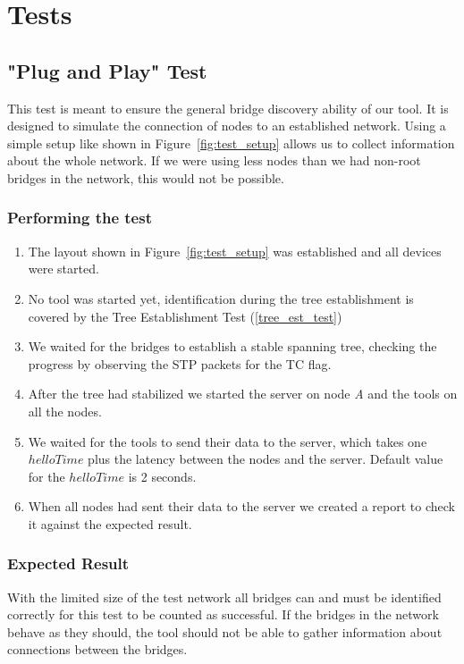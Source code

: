 \section{Tests}
\subsection*{"Plug and Play" Test}
\label{usage_test}
This test is meant to ensure the general bridge discovery ability of our tool.
It is designed to simulate the connection of nodes to an established network.
Using a simple setup like shown in Figure~\ref{fig:test_setup} allows us to collect information about the whole network.
If we were using less nodes than we had non-root bridges in the network, this would not be possible.

\subsubsection*{Performing the test}
\begin{enumerate}
    \item The layout shown in Figure~\ref{fig:test_setup} was established and all devices were started.
    \item No tool was started yet, identification during the tree establishment is covered by the Tree Establishment Test (\ref{tree_est_test})
    \item We waited for the bridges to establish a stable spanning tree, checking the progress by observing the STP packets for the TC flag.
    \item After the tree had stabilized we started the server on node \textit{A} and the tools on all the nodes.
    \item We waited for the tools to send their data to the server, which takes one $helloTime$ plus the latency between the nodes and the server. Default value for the $helloTime$ is 2 seconds.
    \item When all nodes had sent their data to the server we created a report to check it against the expected result.
\end{enumerate}
\subsubsection*{Expected Result}
With the limited size of the test network all bridges can and must be identified correctly for this test to be counted as successful.
If the bridges in the network behave as they should, the tool should not be able to gather information about connections between the bridges.

